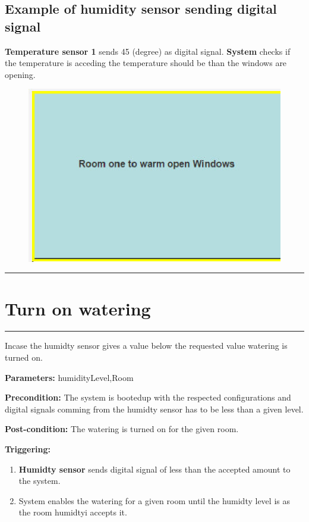 \subsection{Example of humidity sensor sending digital signal}
\textbf{Temperature sensor 1} sends 45 (degree) as digital signal.
\textbf{System} checks if the temperature is acceding the temperature should be
than the windows are opening.
\begin{figure}[H]
\includegraphics[width=1\textwidth]{images/OpenWindows.eps}
\end{figure}
\hfill
\vspace{0.5cm}
\hrule









\section{Turn on watering}

\hrule
\hfill
\vspace{0.5cm}
\label{operation:Turn on watering}

Incase the humidty sensor gives a value below the requested value watering is
turned on.
\begin{description}
\item \textbf{Parameters:} humidityLevel,Room
\item \textbf{Precondition:} The system is bootedup with the respected
configurations and digital signals comming from the humidty sensor has to be
less than a given level.
\item \textbf{Post-condition:} The watering is turned on for the given room.

\item \textbf{Triggering:}
\begin{enumerate}
\item \textbf{Humidty sensor} sends digital signal of less than the accepted
amount to the system.
\item System enables the watering for a given room until the humidty level is
as the room humidtyi accepts it.
\end{enumerate}
\end{description}

